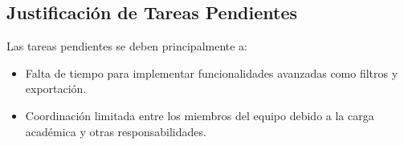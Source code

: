 \subsection*{Justificación de Tareas Pendientes}
Las tareas pendientes se deben principalmente a:
\begin{itemize}
    \item Falta de tiempo para implementar funcionalidades avanzadas como filtros y exportación.
    \item Coordinación limitada entre los miembros del equipo debido a la carga académica y otras responsabilidades.
\end{itemize}